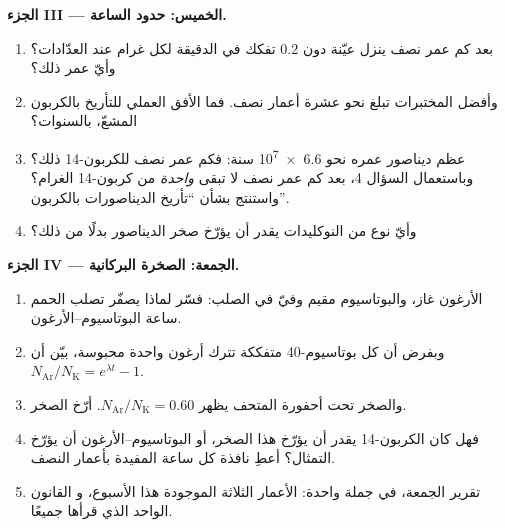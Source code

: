 \begin{problem}
\medskip
\noindent\textbf{الجزء III --- الخميس: حدود الساعة.}
\begin{enumerate}[resume]
  \item بعد كم عمر نصف ينزل  عيّنة دون
        $0.2$ تفكك في الدقيقة لكل غرام عند العدّادات؟ وأيّ عمر ذلك؟
  \item وأفضل المختبرات تبلغ نحو عشرة أعمار نصف. فما
        الأفق العملي للتأريخ بالكربون المشعّ، بالسنوات؟
  \item عظم ديناصور عمره نحو \num{6.6e7} سنة: فكم عمر نصف
        للكربون-14 ذلك؟ وباستعمال السؤال 4، بعد كم عمر نصف
        لا تبقى  \emph{واحدة} من كربون-14 الغرام؟
        واستنتج بشأن ``تأريخ الديناصورات بالكربون''.
  \item وأيّ نوع من النوكليدات يقدر أن يؤرّخ صخر الديناصور بدلًا من ذلك؟
\end{enumerate}

\medskip
\noindent\textbf{الجزء IV --- الجمعة: الصخرة البركانية.}
\begin{enumerate}[resume]
  \item الأرغون غاز، والبوتاسيوم مقيم وفيّ في الصلب: فسّر
        لماذا يصفّر تصلب الحمم ساعة البوتاسيوم--الأرغون.
  \item وبفرض أن كل  بوتاسيوم-40 متفككة تترك  أرغون
        واحدة محبوسة، بيّن أن
        $N_{\mathrm{Ar}}/N_{\mathrm K} = e^{\lambda t} - 1$.
  \item والصخر تحت أحفورة المتحف يظهر
        $N_{\mathrm{Ar}}/N_{\mathrm K} = 0.60$. أرّخ الصخر.
  \item فهل كان الكربون-14 يقدر أن يؤرّخ هذا الصخر، أو البوتاسيوم--الأرغون
        أن يؤرّخ التمثال؟ أعطِ نافذة كل ساعة المفيدة بأعمار النصف.
  \item تقرير الجمعة، في جملة واحدة: الأعمار الثلاثة الموجودة هذا الأسبوع، و
        القانون الواحد الذي قرأها جميعًا.
\end{enumerate}
\end{problem}
